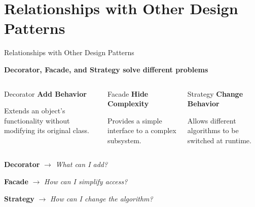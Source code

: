\documentclass[aspectratio=169]{beamer}
\begin{document}
\section{Relationships with Other Design Patterns}

\begin{frame}{Relationships with Other Design Patterns}

\begin{center}
    \Large
    \textbf{Decorator, Facade, and Strategy solve different problems}
\end{center}

\vspace{0.5cm}

\begin{columns}[T]

\begin{block}{Decorator}
    \centering
    \textbf{Add Behavior}
    
    \vspace{0.3cm}
    
    Extends an object's functionality
    without modifying its original class.
\end{block}

\begin{block}{Facade}
    \centering
    \textbf{Hide Complexity}
    
    \vspace{0.3cm}
    
    Provides a simple interface
    to a complex subsystem.
\end{block}

\begin{block}{Strategy}
    \centering
    \textbf{Change Behavior}
    
    \vspace{0.3cm}
    
    Allows different algorithms
    to be switched at runtime.
\end{block}

\end{columns}

\vspace{0.6cm}

\begin{center}
    \Large
    \textbf{Decorator} $\rightarrow$ \textit{What can I add?}
    
    \textbf{Facade} $\rightarrow$ \textit{How can I simplify access?}
    
    \textbf{Strategy} $\rightarrow$ \textit{How can I change the algorithm?}
\end{center}

\end{frame}
\end{document}
